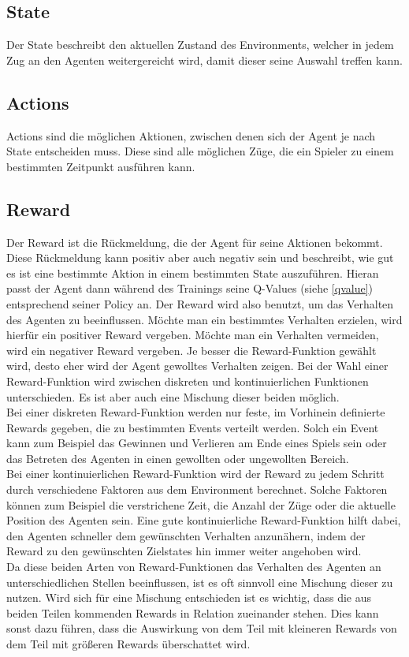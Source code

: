 \subsection{State} \label{state}
Der State beschreibt den aktuellen Zustand des Environments, welcher in jedem Zug  an den Agenten weitergereicht wird, damit dieser seine Auswahl treffen kann. 

\subsection{Actions}
Actions sind die möglichen Aktionen, zwischen denen sich der Agent je nach State entscheiden muss. Diese sind alle möglichen Züge, die ein Spieler zu einem bestimmten Zeitpunkt ausführen kann.

\subsection{Reward}
Der Reward ist die Rückmeldung, die der Agent für seine Aktionen bekommt. Diese Rückmeldung kann positiv aber auch negativ sein und beschreibt, wie gut es ist eine bestimmte Aktion in einem bestimmten State auszuführen. Hieran passt der Agent dann während des Trainings seine Q-Values (siehe  \ref{qvalue}) entsprechend seiner Policy an. Der Reward wird also benutzt, um das Verhalten des Agenten zu beeinflussen. Möchte man ein bestimmtes Verhalten erzielen, wird hierfür ein positiver Reward vergeben. Möchte man ein Verhalten vermeiden, wird ein negativer Reward vergeben. Je besser die  Reward-Funktion gewählt wird, desto eher wird der Agent gewolltes Verhalten zeigen. Bei der Wahl einer Reward-Funktion wird zwischen diskreten und  kontinuierlichen Funktionen unterschieden. Es ist aber auch eine Mischung dieser beiden möglich.\\
Bei einer diskreten Reward-Funktion werden nur feste, im Vorhinein definierte Rewards gegeben, die zu bestimmten Events verteilt werden. Solch ein Event kann zum Beispiel das Gewinnen und Verlieren am Ende eines Spiels sein oder das Betreten des Agenten in einen gewollten oder ungewollten Bereich. \\
Bei einer kontinuierlichen Reward-Funktion wird der Reward zu jedem Schritt durch verschiedene Faktoren aus dem Environment berechnet. Solche Faktoren können zum Beispiel die verstrichene Zeit, die Anzahl der Züge oder die aktuelle Position des Agenten sein. Eine gute kontinuierliche Reward-Funktion hilft dabei, den Agenten schneller dem gewünschten Verhalten anzunähern, indem der Reward zu den gewünschten Zielstates hin immer weiter angehoben wird.\\ 
Da diese beiden Arten von Reward-Funktionen das Verhalten des Agenten an unterschiedlichen Stellen beeinflussen, ist es oft sinnvoll eine Mischung dieser zu nutzen.
Wird sich für eine Mischung entschieden ist es wichtig, dass die aus beiden Teilen kommenden Rewards in Relation zueinander stehen. Dies kann sonst dazu führen, dass die Auswirkung von dem Teil mit kleineren Rewards von dem Teil mit größeren Rewards überschattet wird.\\

